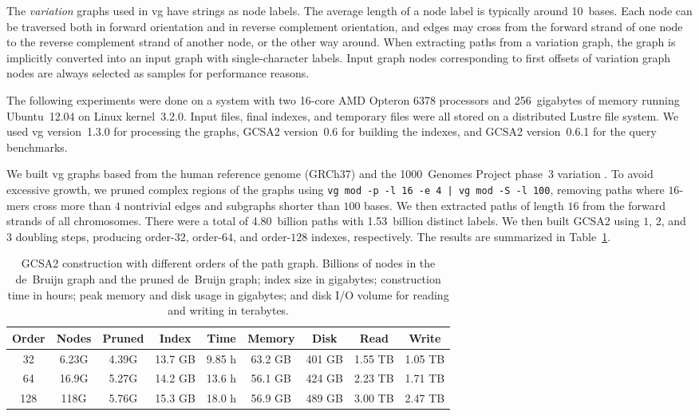 \documentclass[a4paper,UKenglish]{lipics-v2016}
\newcommand{\kmer}[1]{$#1$\nobreakdash-mer}
\newcommand{\orderk}[1]{order\nobreakdash-$#1$}
\begin{document}
The \emph{variation} graphs used in vg have strings as node labels. The average length of a node label is typically around 10~bases. Each node can be traversed both in forward orientation and in reverse complement orientation, and edges may cross from the forward strand of one node to the reverse complement strand of another node, or the other way around. When extracting paths from a variation graph, the graph is implicitly converted into an input graph with single-character labels. Input graph nodes corresponding to first offsets of variation graph nodes are always selected as samples for performance reasons.

The following experiments were done on a system with two 16\nobreakdash-core AMD Opteron 6378 processors and 256~gigabytes of memory running Ubuntu~12.04 on Linux kernel~3.2.0. Input files, final indexes, and temporary files were all stored on a distributed Lustre file system. We used vg version~1.3.0 for processing the graphs, GCSA2 version~0.6 for building the indexes, and GCSA2 version~0.6.1 for the query benchmarks.

We built vg graphs based from the human reference genome (GRCh37) and the 1000~Genomes Project phase~3 variation \cite{1000GP2015}. To avoid excessive growth, we pruned complex regions of the graphs using \texttt{vg mod -p -l 16 -e 4 | vg mod -S -l 100}, removing paths where \kmer{16}s cross more than $4$ nontrivial edges and subgraphs shorter than $100$ bases. We then extracted paths of length $16$ from the forward strands of all chromosomes. There were a total of 4.80~billion paths with 1.53~billion distinct labels. We then built GCSA2 using $1$, $2$, and $3$ doubling steps, producing \orderk{32}, \orderk{64}, and \orderk{128} indexes, respectively. The results are summarized in Table~\ref{table:construction}.

\begin{table}[t!]
\begin{center}
\caption{GCSA2 construction with different orders of the path graph. Billions of nodes in the de~Bruijn graph and the pruned de~Bruijn graph; index size in gigabytes; construction time in hours; peak memory and disk usage in gigabytes; and disk I/O volume for reading and writing in terabytes.}\label{table:construction}
\begin{tabular}{c|ccc|ccc|cc}
\hline
\textbf{Order} & \textbf{Nodes} & \textbf{Pruned} & \textbf{Index} & \textbf{Time} & \textbf{Memory} & \textbf{Disk} & \textbf{Read} & \textbf{Write} \\
\hline
 32 & 6.23G & 4.39G & 13.7 GB & 9.85 h & 63.2 GB & 401 GB & 1.55 TB & 1.05 TB \\
 64 & 16.9G & 5.27G & 14.2 GB & 13.6 h & 56.1 GB & 424 GB & 2.23 TB & 1.71 TB \\
128 &  118G & 5.76G & 15.3 GB & 18.0 h & 56.9 GB & 489 GB & 3.00 TB & 2.47 TB \\
\hline
\end{tabular}
\end{center}
\end{table}
\end{document}
